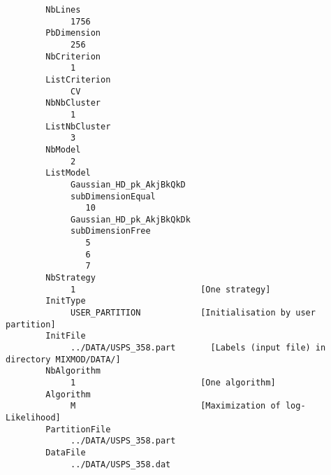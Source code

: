 



{\scriptsize
 \begin{verbatim}
        NbLines
             1756
        PbDimension
             256
        NbCriterion
             1
        ListCriterion
             CV
        NbNbCluster
             1
        ListNbCluster
             3
        NbModel
             2
        ListModel
             Gaussian_HD_pk_AkjBkQkD
             subDimensionEqual
                10
             Gaussian_HD_pk_AkjBkQkDk
             subDimensionFree
                5
                6
                7
        NbStrategy
             1                         [One strategy]
        InitType
             USER_PARTITION            [Initialisation by user partition]
        InitFile
             ../DATA/USPS_358.part       [Labels (input file) in directory MIXMOD/DATA/]
        NbAlgorithm
             1                         [One algorithm]
        Algorithm
             M                         [Maximization of log-Likelihood]
        PartitionFile
             ../DATA/USPS_358.part
        DataFile
             ../DATA/USPS_358.dat
 \end{verbatim}
}



